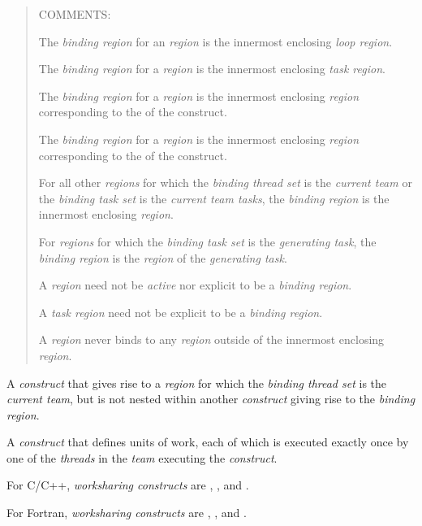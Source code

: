 \begin{quote}
COMMENTS: 

The \emph{binding region} for an  \emph{region} is the innermost enclosing 
\emph{loop region}.

The \emph{binding region} for a  \emph{region} is the innermost enclosing 
\emph{task region}.

The \emph{binding region} for a  \emph{region} is the innermost enclosing \emph{region} corresponding to the  of the  construct.

The \emph{binding region} for a  \emph{region} is the innermost enclosing \emph{region} corresponding to the  of the  construct.

For all other \emph{regions} for which the \emph{binding thread set} is the \emph{current
team} or the \emph{binding task set} is the \emph{current team tasks}, the \emph{binding 
region} is the innermost enclosing  \emph{region}.

For \emph{regions} for which the \emph{binding task set} is the \emph{generating task}, the 
\emph{binding region} is the \emph{region} of the \emph{generating task}.

A  \emph{region} need not be \emph{active} nor explicit to be a \emph{binding region}.

A \emph{task region} need not be explicit to be a \emph{binding region}.

A \emph{region} never binds to any \emph{region} outside of the innermost enclosing 
 \emph{region}.
\end{quote}
\glossarydefend

\glossarydefstart
A \emph{construct} that gives rise to a \emph{region} for which the \emph{binding thread set} is the \emph{current 
team}, but is not nested within another \emph{construct} giving rise to the \emph{binding region}.
\glossarydefend

\glossarydefstart
A \emph{construct} that defines units of work, each of which is executed exactly once by 
one of the \emph{threads} in the \emph{team} executing the \emph{construct}.

For C/C++, \emph{worksharing constructs} are , , and .

For Fortran, \emph{worksharing constructs} are , ,  and 
.
\glossarydefend

